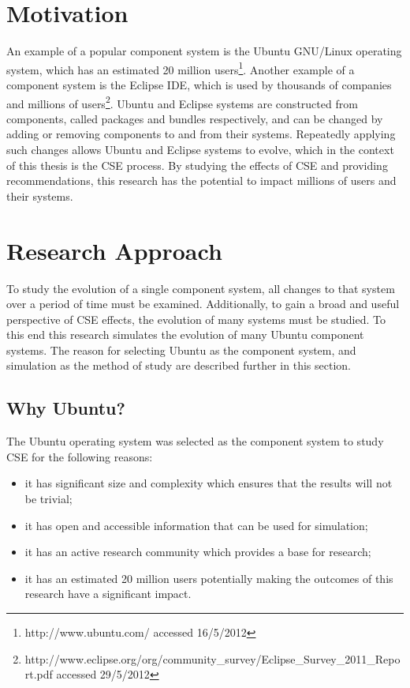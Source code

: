 \section{Motivation}
An example of a popular component system is the Ubuntu GNU/Linux operating system, which has an estimated 20 million users\footnote{http://www.ubuntu.com/ accessed 16/5/2012}. 
Another example of a component system is the Eclipse IDE, which is used by thousands of companies and millions of users\footnote{http://www.eclipse.org/org/community\_survey/Eclipse\_Survey\_2011\_Report.pdf  accessed 29/5/2012}.
Ubuntu and Eclipse systems are constructed from components, called packages and bundles respectively, 
and can be changed by adding or removing components to and from their systems.
Repeatedly applying such changes allows Ubuntu and Eclipse systems to evolve, which in the context of this thesis is the CSE process.
By studying the effects of CSE and providing recommendations, this research has the potential to impact millions of users and their systems.

\section{Research Approach}
To study the evolution of a single component system, all changes to that system over a period of time must be examined.
Additionally, to gain a broad and useful perspective of CSE effects, the evolution of many systems must be studied.
To this end this research simulates the evolution of many Ubuntu component systems.
The reason for selecting Ubuntu as the component system, and simulation as the method of study are described further in this section.

\subsection{Why Ubuntu?}
The Ubuntu operating system was selected as the component system to study CSE for the following reasons:
\begin{itemize}
  \item it has significant size and complexity which ensures that the results will not be trivial;
  \item it has open and accessible information that can be used for simulation;
  \item it has an active research community which provides a base for research;
  \item it has an estimated 20 million users potentially making the outcomes of this research have a significant impact.
\end{itemize} 

